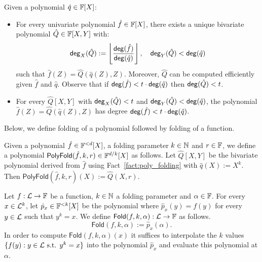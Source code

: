 \begin{lemma}\label{fact:poly_folding} 
Given a polynomial $\hat{q}\in\mathbb{F}[X]$:
\begin{itemize}
        \item For every univariate polynomial $\hat{f}\in\mathbb{F}[X]$, there exists a unique bivariate polynomial $\hat{Q}\in\mathbb{F}[X,Y]$ with:
        \[
          \mathsf{deg}_X(\hat{Q}) := \left\lfloor \frac{\mathsf{deg}(\hat{f})}{\mathsf{deg}(\hat{q})} \right\rfloor,\quad \mathsf{deg}_Y(\hat{Q}) < \mathsf{deg}(\hat{q})
        \]
        such that $\hat{f}(Z)=\hat{Q}(\hat{q}(Z),Z)$. Moreover, $\hat{Q}$ can be computed efficiently given $\hat{f}$ and $\hat{q}$. Observe that if $\mathsf{deg}(\hat{f})<t\cdot\mathsf{deg}(\hat{q})$ then
        $\mathsf{deg}(\hat{Q})<t$.
        
        \item For every $\hat{Q}[X,Y]$ with $\mathsf{deg}_X(\hat{Q})<t$ and $\mathsf{deg}_Y(\hat{Q})<\mathsf{deg}(\hat{q})$, the polynomial $\hat{f}(Z)=\hat{Q}(\hat{q}(Z),Z)$ has degree $\mathsf{deg}(\hat{f})<t\cdot\mathsf{deg}(\hat{q})$.
\end{itemize}
\end{lemma}

Below, we define folding of a polynomial followed by folding of a function.
\begin{definition}\label{def:poly_folding}
    Given a polynomial $\hat{f}\in\mathbb{F}^{<d}[X]$, a folding parameter $k\in\mathbb{N}$ and $r\in\mathbb{F}$, we define a polynomial $\mathsf{PolyFold}(\hat{f},k,r)\in\mathbb{F}^{d/k}[X]$ as follows. Let $\hat{Q}[X,Y]$ be the bivariate polynomial derived from $\hat{f}$ using Fact~\ref{fact:poly_folding} with $\hat{q}(X):=X^k$. Then $\mathsf{PolyFold}(\hat{f},k,r)(X):=\hat{Q}(X,r)$.
\end{definition}

\begin{definition}\label{def:fn_folding}
Let $f:\mathcal{L}\rightarrow\mathbb{F}$ be a function, $k\in\mathbb{N}$ a folding parameter and $\alpha\in\mathbb{F}$. For every $x\in{\mathcal{L}}^k$, let $\hat{p}_x\in\mathbb{F}^{<k}[X]$ be the polynomial where $\hat{p}_x(y)=f(y)$ for every $y\in{\mathcal{L}}$ such that $y^k=x$. We define $\mathsf{Fold}(f,k,\alpha):\mathcal{L}\rightarrow\mathbb{F}$ as follows.
\[
    \mathsf{Fold}(f,k,\alpha):=\hat{p}_x(\alpha).
\]
In order to compute $\mathsf{Fold}(f,k,\alpha)(x)$ it suffices to interpolate the $k$ values $\{f(y):y\in\mathcal{L}\text{ s.t. }y^k=x\}$ into the polynomial $\hat{p}_x$ and evaluate this polynomial at $\alpha$.
\end{definition}

